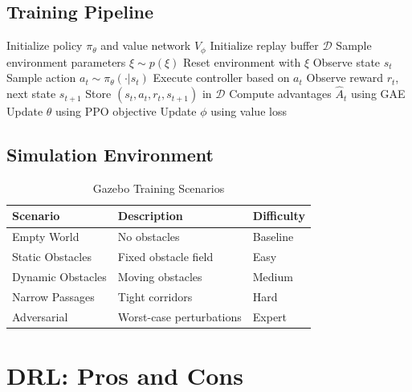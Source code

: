 \documentclass[11pt,a4paper]{article}
\begin{document}
\subsection{Training Pipeline}

\begin{algorithm}[H]
\caption{DRL Training for Switching Supervisor}
\begin{algorithmic}[1]
\State Initialize policy $\pi_\theta$ and value network $V_\phi$
\State Initialize replay buffer $\mathcal{D}$
  \State Sample environment parameters $\xi \sim p(\xi)$ 
  \State Reset environment with $\xi$
    \State Observe state $s_t$
    \State Sample action $a_t \sim \pi_\theta(\cdot | s_t)$
    \State Execute controller based on $a_t$
    \State Observe reward $r_t$, next state $s_{t+1}$
    \State Store $(s_t, a_t, r_t, s_{t+1})$ in $\mathcal{D}$
  \EndFor
    \State Compute advantages $\hat{A}_t$ using GAE
    \State Update $\theta$ using PPO objective
    \State Update $\phi$ using value loss
  \EndIf
\EndFor
\end{algorithmic}
\end{algorithm}

\subsection{Simulation Environment}

\begin{table}[h]
\centering
\caption{Gazebo Training Scenarios}
\begin{tabular}{lll}
\toprule
\textbf{Scenario} & \textbf{Description} & \textbf{Difficulty} \\
\midrule
Empty World & No obstacles & Baseline \\
Static Obstacles & Fixed obstacle field & Easy \\
Dynamic Obstacles & Moving obstacles & Medium \\
Narrow Passages & Tight corridors & Hard \\
Adversarial & Worst-case perturbations & Expert \\
\bottomrule
\end{tabular}
\end{table}

\section{DRL: Pros and Cons}
\end{document}
